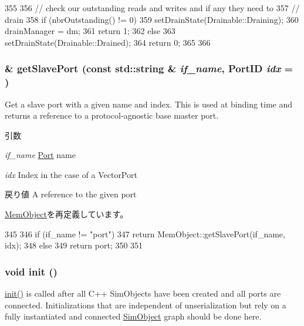 \begin{DoxyCode}
355 {
356     // check our outstanding reads and writes and if any they need to
357     // drain
358     if (nbrOutstanding() != 0) {
359         setDrainState(Drainable::Draining);
360         drainManager = dm;
361         return 1;
362     } else {
363         setDrainState(Drainable::Drained);
364         return 0;
365     }
366 }
\end{DoxyCode}
\hypertarget{classDRAMSim2_ac918a145092d7514ebc6dbd952dceafb}{
\subsubsection[{getSlavePort}]{ \& getSlavePort (const std::string \& {\em if\_\-name}, \/  {\bf PortID} {\em idx} = {})}}
\label{classDRAMSim2_ac918a145092d7514ebc6dbd952dceafb}
Get a slave port with a given name and index. This is used at binding time and returns a reference to a protocol-\/agnostic base master port.


\begin{DoxyParams}{引数}
\item[{\em if\_\-name}]\hyperlink{classPort}{Port} name \item[{\em idx}]Index in the case of a VectorPort\end{DoxyParams}
\begin{DoxyReturn}{戻り値}
A reference to the given port 
\end{DoxyReturn}


\hyperlink{classMemObject_ac918a145092d7514ebc6dbd952dceafb}{MemObject}を再定義しています。


\begin{DoxyCode}
345 {
346     if (if_name != "port") {
347         return MemObject::getSlavePort(if_name, idx);
348     } else {
349         return port;
350     }
351 }
\end{DoxyCode}
\hypertarget{classDRAMSim2_a02fd73d861ef2e4aabb38c0c9ff82947}{
\subsubsection[{init}]{\setlength{\rightskip}{0pt plus 5cm}void init ()}}
\label{classDRAMSim2_a02fd73d861ef2e4aabb38c0c9ff82947}
\hyperlink{classDRAMSim2_a02fd73d861ef2e4aabb38c0c9ff82947}{init()} is called after all C++ SimObjects have been created and all ports are connected. Initializations that are independent of unserialization but rely on a fully instantiated and connected \hyperlink{classSimObject}{SimObject} graph should be done here. 

